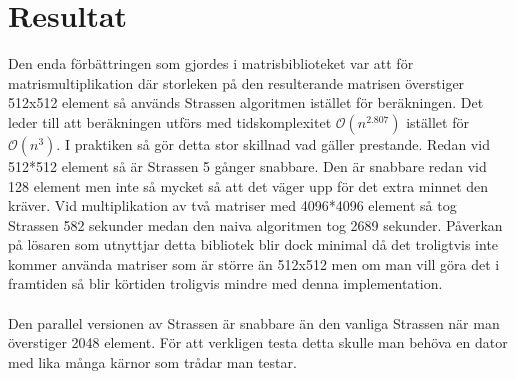 \section{Resultat}
Den enda förbättringen som gjordes i matrisbiblioteket var att för matrismultiplikation där storleken på den resulterande matrisen överstiger 512x512 element så används Strassen algoritmen istället för beräkningen. Det leder till att beräkningen utförs med tidskomplexitet $\mathcal{O}(n^{2.807})$ istället för $\mathcal{O}(n^{3})$. I praktiken så gör detta stor skillnad vad gäller prestande. Redan vid 512*512 element så är Strassen 5 gånger snabbare. Den är snabbare redan vid 128 element men inte så mycket så att det väger upp för det extra minnet den kräver. Vid multiplikation av två matriser med 4096*4096 element så tog Strassen 582 sekunder medan den naiva algoritmen tog 2689 sekunder. Påverkan på lösaren som utnyttjar detta bibliotek blir dock minimal då det troligtvis inte kommer använda matriser som är större än 512x512 men om man vill göra det i framtiden så blir körtiden troligvis mindre med denna implementation.
\\
\\
Den parallel versionen av Strassen är snabbare än den vanliga Strassen när man överstiger 2048 element. För att verkligen testa detta skulle man behöva en dator med lika många kärnor som trådar man testar. 